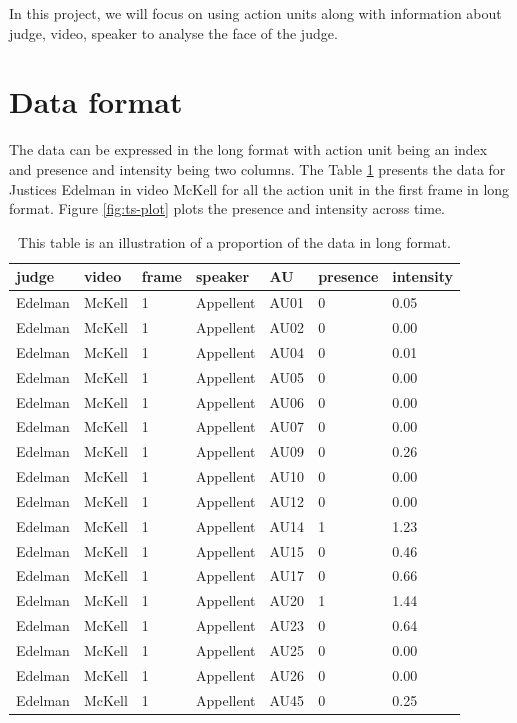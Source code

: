 \documentclass{monashthesis}
\begin{document}
In this project, we will focus on using action units along with information about judge, video, speaker to analyse the face of the judge.

\hypertarget{data-format}{%
\section{Data format}\label{data-format}}

The data can be expressed in the long format with action unit being an index and presence and intensity being two columns. The Table \ref{tab:long} presents the data for Justices Edelman in video McKell for all the action unit in the first frame in long format. Figure \ref{fig:ts-plot} plots the presence and intensity across time.

\begin{table}[ht]
\begin{center}
\caption{\label{tab:long} This table is an illustration of a proportion of the data in long format.}
\begin{tabular}{lllllll}
\toprule
judge & video & frame & speaker & AU & presence & intensity \\
\midrule
Edelman & McKell & 1 & Appellent & AU01 & 0 & 0.05 \\
Edelman & McKell & 1 & Appellent & AU02 & 0 & 0.00 \\
Edelman & McKell & 1 & Appellent & AU04 & 0 & 0.01 \\
Edelman & McKell & 1 & Appellent & AU05 & 0 & 0.00 \\
Edelman & McKell & 1 & Appellent & AU06 & 0 & 0.00 \\
Edelman & McKell & 1 & Appellent & AU07 & 0 & 0.00 \\
Edelman & McKell & 1 & Appellent & AU09 & 0 & 0.26 \\
Edelman & McKell & 1 & Appellent & AU10 & 0 & 0.00 \\
Edelman & McKell & 1 & Appellent & AU12 & 0 & 0.00 \\
Edelman & McKell & 1 & Appellent & AU14 & 1 & 1.23 \\
Edelman & McKell & 1 & Appellent & AU15 & 0 & 0.46 \\
Edelman & McKell & 1 & Appellent & AU17 & 0 & 0.66 \\
Edelman & McKell & 1 & Appellent & AU20 & 1 & 1.44 \\
Edelman & McKell & 1 & Appellent & AU23 & 0 & 0.64 \\
Edelman & McKell & 1 & Appellent & AU25 & 0 & 0.00 \\
Edelman & McKell & 1 & Appellent & AU26 & 0 & 0.00 \\
Edelman & McKell & 1 & Appellent & AU45 & 0 & 0.25 \\
\bottomrule
\end{tabular}
\end{center}
\end{table}
\end{document}
